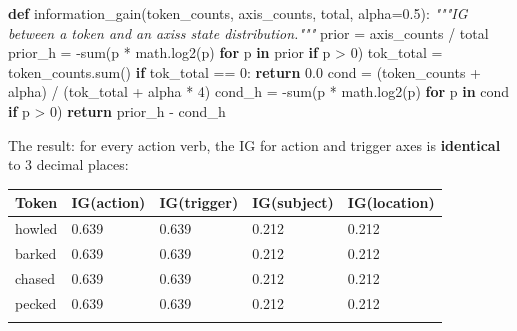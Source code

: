 \documentclass[
  twocolumn,
  10pt,
  a4paper]{article}
\newenvironment{Shaded}{}{}
\newcommand{\BuiltInTok}[1]{\textcolor[rgb]{0.00,0.50,0.00}{#1}}
\newcommand{\CommentTok}[1]{\textcolor[rgb]{0.38,0.63,0.69}{\textit{#1}}}
\newcommand{\ControlFlowTok}[1]{\textcolor[rgb]{0.00,0.44,0.13}{\textbf{#1}}}
\newcommand{\DecValTok}[1]{\textcolor[rgb]{0.25,0.63,0.44}{#1}}
\newcommand{\FloatTok}[1]{\textcolor[rgb]{0.25,0.63,0.44}{#1}}
\newcommand{\KeywordTok}[1]{\textcolor[rgb]{0.00,0.44,0.13}{\textbf{#1}}}
\newcommand{\NormalTok}[1]{#1}
\newcommand{\OperatorTok}[1]{\textcolor[rgb]{0.40,0.40,0.40}{#1}}
\newenvironment{tsxtable}{\begin{center}\footnotesize}{\end{center}}
\let\endhead\relax
\begin{document}
\begin{Shaded}
\begin{Highlighting}[]
\KeywordTok{def}\NormalTok{ information\_gain(token\_counts, axis\_counts, total, alpha}\OperatorTok{=}\FloatTok{0.5}\NormalTok{):}
    \CommentTok{"""IG between a token and an axis\textquotesingle{}s state distribution."""}
\NormalTok{    prior }\OperatorTok{=}\NormalTok{ axis\_counts }\OperatorTok{/}\NormalTok{ total}
\NormalTok{    prior\_h }\OperatorTok{=} \OperatorTok{{-}}\BuiltInTok{sum}\NormalTok{(p }\OperatorTok{*}\NormalTok{ math.log2(p) }\ControlFlowTok{for}\NormalTok{ p }\KeywordTok{in}\NormalTok{ prior }\ControlFlowTok{if}\NormalTok{ p }\OperatorTok{\textgreater{}} \DecValTok{0}\NormalTok{)}
\NormalTok{    tok\_total }\OperatorTok{=}\NormalTok{ token\_counts.}\BuiltInTok{sum}\NormalTok{()}
    \ControlFlowTok{if}\NormalTok{ tok\_total }\OperatorTok{==} \DecValTok{0}\NormalTok{:}
        \ControlFlowTok{return} \FloatTok{0.0}
\NormalTok{    cond }\OperatorTok{=}\NormalTok{ (token\_counts }\OperatorTok{+}\NormalTok{ alpha) }\OperatorTok{/}\NormalTok{ (tok\_total }\OperatorTok{+}\NormalTok{ alpha }\OperatorTok{*} \DecValTok{4}\NormalTok{)}
\NormalTok{    cond\_h }\OperatorTok{=} \OperatorTok{{-}}\BuiltInTok{sum}\NormalTok{(p }\OperatorTok{*}\NormalTok{ math.log2(p) }\ControlFlowTok{for}\NormalTok{ p }\KeywordTok{in}\NormalTok{ cond }\ControlFlowTok{if}\NormalTok{ p }\OperatorTok{\textgreater{}} \DecValTok{0}\NormalTok{)}
    \ControlFlowTok{return}\NormalTok{ prior\_h }\OperatorTok{{-}}\NormalTok{ cond\_h}
\end{Highlighting}
\end{Shaded}

The result: for every action verb, the IG for action and trigger axes is
\textbf{identical} to 3 decimal places:

\begin{tsxtable}\begin{tabularx}{\linewidth}{@{}YYYYY@{}}
\toprule\noalign{}
Token & IG(action) & IG(trigger) & IG(subject) & IG(location) \\
\midrule\noalign{}
\endhead
howled & 0.639 & 0.639 & 0.212 & 0.212 \\
barked & 0.639 & 0.639 & 0.212 & 0.212 \\
chased & 0.639 & 0.639 & 0.212 & 0.212 \\
pecked & 0.639 & 0.639 & 0.212 & 0.212 \\
\bottomrule\noalign{}
\end{tabularx}\end{tsxtable}
\end{document}
